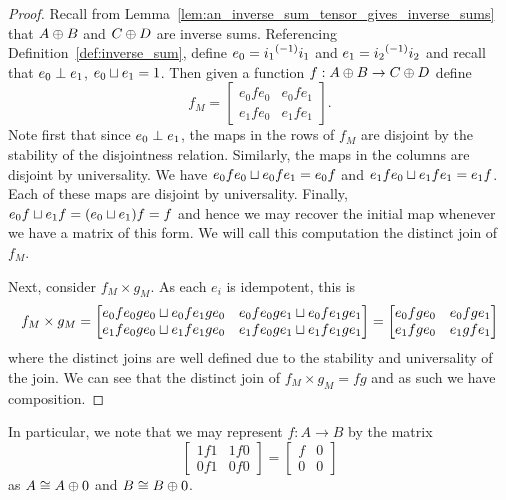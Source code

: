\begin{proof}
  Recall from Lemma~\ref{lem:an_inverse_sum_tensor_gives_inverse_sums} that $A\oplus B$ and $C\oplus D$ are
  inverse sums. Referencing Definition~\ref{def:inverse_sum}, define $e_0 = {i_1}^{(-1)}i_1$ and $e_1
  = {i_2}^{(-1)}i_2$ and recall that $e_0 \perp e_1$, $e_0 \sqcup e_1 = 1$. Then given a function
  $f:A\oplus B \to C\oplus D$ define
  \[ f_M =
     \begin{bmatrix}
       e_0 f e_0 & e_0 f e_1 \\
       e_1 f e_0 & e_1 f e_1
      \end{bmatrix}.
  \]
  Note first that since $e_0 \perp e_1$, the maps in the rows of $f_M$ are disjoint by the
  stability of the disjointness relation. Similarly, the maps in the columns are disjoint by
  universality. We have $e_0 f e_0 \sqcup e_0 f e_1 = e_0 f$ and $e_1 f e_0 \sqcup e_1 f e_1 = e_1
  f$. Each of these maps are disjoint by universality. Finally, $e_0 f \sqcup e_1 f = (e_0 \sqcup
  e_1) f = f$ and hence we may recover the initial map whenever we have a matrix of this form.
  We will call this computation the distinct join of $f_M$.

  Next, consider $f_M \times g_M$. As each $e_i$ is idempotent, this is
  \[ f_M \times g_M =
     \begin{bmatrix}
       e_0 f e_0 g e_0 \sqcup e_0 f e_1 g e_0 & e_0 f e_0 g e_1 \sqcup e_0 f e_1 g e_1 \\
       e_1 f e_0 g e_0 \sqcup e_1 f e_1 g e_0 & e_1 f e_0 g e_1 \sqcup e_1 f e_1 g e_1
      \end{bmatrix}
      =
     \begin{bmatrix}
       e_0 f g e_0  & e_0 f  g e_1  \\
       e_1 f  g e_0 & e_1  g f e_1
      \end{bmatrix}
  \]
  where the distinct joins are well defined due to the stability and universality of the join.
  We can see that the distinct join of $f_M \times g_M = f g$ and as such we have composition.

\end{proof}

In particular, we note that we may represent $f:A\to B$ by the matrix
\[
  \begin{bmatrix}
    1f1& 1f 0 \\ 0 f 1 & 0 f 0
  \end{bmatrix}
  =
  \begin{bmatrix}
    f& 0 \\ 0 & 0
  \end{bmatrix}
\]
as $A \cong A\oplus0$ and $B \cong B\oplus0$.

